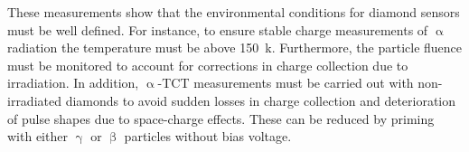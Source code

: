 These measurements show that the environmental conditions for diamond sensors must be well defined. For instance, to ensure stable charge measurements of $\upalpha$ radiation the temperature must be above 150~k. Furthermore, the particle fluence must be monitored to account for corrections in charge collection due to irradiation. In addition, $\upalpha$-TCT measurements must be carried out with non-irradiated diamonds to avoid sudden losses in charge collection and deterioration of pulse shapes due to space-charge effects. These can be reduced by priming with either $\upgamma$ or $\upbeta$ particles without bias voltage.


